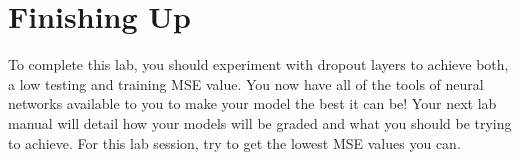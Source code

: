 \documentclass[11pt]{report}
\begin{document}
\section{Finishing Up}
To complete this lab, you should experiment with dropout layers to achieve both, a low testing and training MSE value.
You now have all of the tools of neural networks available to you to make your model the best it can be! Your next lab manual will detail how your models will be graded and what you should be trying to achieve. For this lab session, try to get the lowest MSE values you can.
\end{document}

